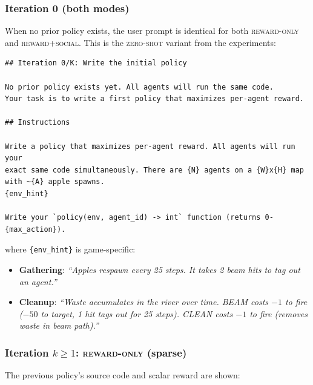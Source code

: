\documentclass{nextgame2026} %
\begin{document}
\subsubsection{Iteration 0 (both modes)}

When no prior policy exists, the user prompt is identical for both
\textsc{reward-only} and \textsc{reward+social}. This is the \textsc{zero-shot} variant from the experiments:

\begin{lstlisting}[style=pysmall, caption={User prompt at iteration~0 (both modes).}, basicstyle=\ttfamily\tiny]
## Iteration 0/K: Write the initial policy

No prior policy exists yet. All agents will run the same code.
Your task is to write a first policy that maximizes per-agent reward.

## Instructions

Write a policy that maximizes per-agent reward. All agents will run your
exact same code simultaneously. There are {N} agents on a {W}x{H} map
with ~{A} apple spawns.
{env_hint}

Write your `policy(env, agent_id) -> int` function (returns 0-{max_action}).
\end{lstlisting}

\noindent where \texttt{\{env\_hint\}} is game-specific:
\begin{itemize}
\item \textbf{Gathering}: \emph{``Apples respawn every 25 steps. It takes 2
  beam hits to tag out an agent.''}
\item \textbf{Cleanup}: \emph{``Waste accumulates in the river over time.
  BEAM costs $-1$ to fire ($-50$ to target, 1 hit tags out for 25 steps).
  CLEAN costs $-1$ to fire (removes waste in beam path).''}
\end{itemize}

\subsubsection{Iteration $k \geq 1$: \textsc{reward-only} (sparse)}

The previous policy's source code and scalar reward are shown:
\end{document}
